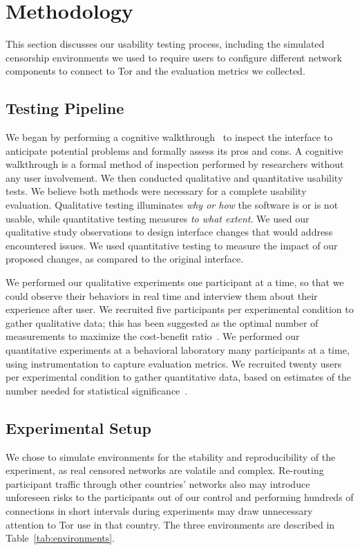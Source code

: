 \documentclass[USenglish,oneside,twocolumn]{article}
\begin{document}
\section{Methodology} 
This section discusses our usability testing process, including the simulated censorship environments we used to require users to configure different network components to connect to Tor and the evaluation metrics  we collected.

\subsection{Testing Pipeline} 
We began by performing a cognitive walkthrough~\cite{wharton1994cognitive,cognitive-walkthrough} to inspect the interface to anticipate potential problems and formally assess its pros and cons.
A cognitive walkthrough is a formal method of inspection performed by researchers without any user involvement.
We then conducted qualitative and quantitative usability tests.
We believe both methods were necessary for a complete usability evaluation.
Qualitative testing illuminates {\it why or how} the software is or is not usable, while quantitative testing measures {\it to what extent}.
We used our qualitative study observations to design interface changes that would address encountered issues.
We used quantitative testing to measure the impact of our proposed changes, as compared to the original interface.

We performed our qualitative experiments one participant at a time, so that we could observe their behaviors in real time and interview them about their experience after user.
We recruited five participants per experimental condition to gather qualitative data; this has been suggested as the optimal number of measurements to maximize the cost-benefit ratio~\cite{howmanyusers}.
We performed our quantitative experiments at a behavioral laboratory many participants at a time, using instrumentation to capture evaluation metrics.
We recruited twenty users per experimental condition to gather quantitative data, based on estimates of the number needed for statistical significance~\cite{howmanyusers}.

\subsection{Experimental Setup}
\label{sec:environments}
We chose to simulate environments for the stability and reproducibility of the experiment, as real censored networks are volatile and complex. Re-routing participant traffic through other countries' networks also may introduce unforeseen risks to the participants out of our control and performing hundreds of connections in short intervals during experiments may draw unnecessary attention to Tor use in that country. The three environments are described in Table~\ref{tab:environments}.
\end{document}
